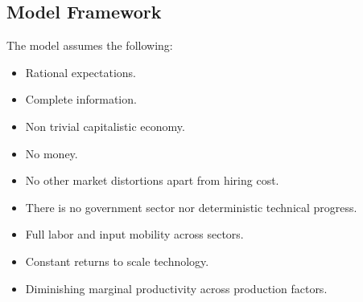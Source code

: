 \subsection{Model Framework}
The model assumes the following:
\begin{itemize}
\item Rational expectations.
\item Complete information.
\item Non trivial capitalistic economy.
\item No money.
\item No other market distortions apart from hiring cost.
\item There is no government sector nor deterministic technical progress.
\item Full labor and input mobility across sectors.
\item Constant returns to scale technology.
\item Diminishing marginal productivity across production factors.
\end{itemize}

